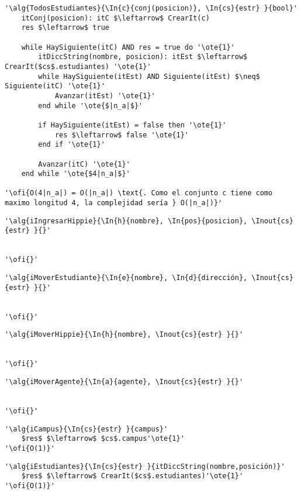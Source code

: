 \begin{lstlisting}[mathescape]
'\alg{TodosEstudiantes}{\In{c}{conj(posicion)}, \In{cs}{estr} }{bool}'
	itConj(posicion): itC $\leftarrow$ CrearIt(c)
	res $\leftarrow$ true
	
	while HaySiguiente(itC) AND res = true do '\ote{1}'
		itDiccString(nombre, posicion): itEst $\leftarrow$ CrearIt($cs$.estudiantes) '\ote{1}'
		while HaySiguiente(itEst) AND Siguiente(itEst) $\neq$ Siguiente(itC) '\ote{1}'
			Avanzar(itEst) '\ote{1}'
		end while '\ote{$|n_a|$}'

		if HaySiguiente(itEst) = false then '\ote{1}'
			res $\leftarrow$ false '\ote{1}'
		end if '\ote{1}'

		Avanzar(itC) '\ote{1}'
	end while '\ote{$4|n_a|$}'

'\ofi{O(4|n_a|) = O(|n_a|) \text{. Como el conjunto c tiene como maximo longitud 4, la complejidad sería } O(|n_a|)}'
\end{lstlisting}

\begin{lstlisting}[mathescape]
'\alg{iIngresarHippie}{\In{h}{nombre}, \In{pos}{posicion}, \Inout{cs}{estr} }{}'

	
'\ofi{}'
\end{lstlisting}

\begin{lstlisting}[mathescape]
'\alg{iMoverEstudiante}{\In{e}{nombre}, \In{d}{dirección}, \Inout{cs}{estr} }{}'

	
'\ofi{}'
\end{lstlisting}

\begin{lstlisting}[mathescape]
'\alg{iMoverHippie}{\In{h}{nombre}, \Inout{cs}{estr} }{}'

	
'\ofi{}'
\end{lstlisting}

\begin{lstlisting}[mathescape]
'\alg{iMoverAgente}{\In{a}{agente}, \Inout{cs}{estr} }{}'

	
'\ofi{}'
\end{lstlisting}

\begin{lstlisting}[mathescape]
'\alg{iCampus}{\In{cs}{estr} }{campus}'
	$res$ $\leftarrow$ $cs$.campus'\ote{1}'
'\ofi{O(1)}'
\end{lstlisting}

\begin{lstlisting}[mathescape]
'\alg{iEstudiantes}{\In{cs}{estr} }{itDiccString(nombre,posición)}'
	$res$ $\leftarrow$ CrearIt($cs$.estudiantes)'\ote{1}'
'\ofi{O(1)}'
\end{lstlisting}

